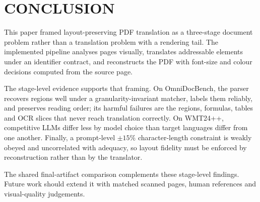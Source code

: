 \section{CONCLUSION}
\label{sec:conclusion}

This paper framed layout-preserving PDF translation as a three-stage document
problem rather than a translation problem with a rendering tail. The implemented
pipeline analyses pages visually, translates addressable elements under an
identifier contract, and reconstructs the PDF with font-size and colour
decisions computed from the source page.

The stage-level evidence supports that framing. On OmniDocBench, the parser
recovers regions well under a granularity-invariant matcher, labels them
reliably, and preserves reading order; its harmful failures are the regions,
formulas, tables and OCR slices that never reach translation correctly. On
WMT24++, competitive LLMs differ less by model choice than target languages
differ from one another. Finally, a prompt-level $\pm15\%$ character-length
constraint is weakly obeyed and uncorrelated with adequacy, so layout fidelity
must be enforced by reconstruction rather than by the translator.

The shared final-artifact comparison complements these stage-level findings.
Future work should extend it with matched scanned pages, human references and
visual-quality judgements.
